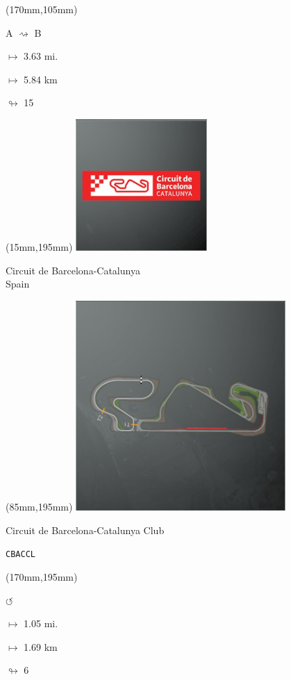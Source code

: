 \begin{textblock*}{30mm}(170mm,105mm)%
\par A $\rightsquigarrow$ B
\Large
\par$\mapsto$ 3.63 mi.
\par$\mapsto$ 5.84 km
\par$\looparrowright$ 15
\end{textblock*}
\begin{textblock*}{60mm}(15mm,195mm)%
\includegraphics[width=50mm]{LG/2015-05-20_00078.png}
\par Circuit de Barcelona-Catalunya\\ Spain
\end{textblock*}
\begin{textblock*}{80mm}(85mm,195mm)%
\includegraphics[width=80mm]{TR/2015-05-20_00020.png}
\centerline{Circuit de Barcelona-Catalunya Club}
\par\hfill\tiny\tt CBACCL\\
\end{textblock*}
\begin{textblock*}{30mm}(170mm,195mm)%
\par \Huge$\circlearrowleft$
\Large
\par$\mapsto$ 1.05 mi.
\par$\mapsto$ 1.69 km
\par$\looparrowright$ 6
\end{textblock*}
\null\newpage

